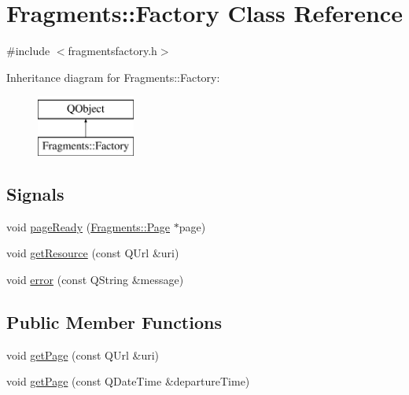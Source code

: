 \hypertarget{classFragments_1_1Factory}{}\section{Fragments\+:\+:Factory Class Reference}
\label{classFragments_1_1Factory}


{\ttfamily \#include $<$fragmentsfactory.\+h$>$}

Inheritance diagram for Fragments\+:\+:Factory\+:\begin{figure}[H]
\begin{center}
\leavevmode
\includegraphics[height=2.000000cm]{classFragments_1_1Factory}
\end{center}
\end{figure}
\subsection*{Signals}
\begin{DoxyCompactItemize}
\item 
void \mbox{\hyperlink{classFragments_1_1Factory_a9559b78a9960c0d4981bf752b47d710a}{page\+Ready}} (\mbox{\hyperlink{classFragments_1_1Page}{Fragments\+::\+Page}} $\ast$page)
\item 
void \mbox{\hyperlink{classFragments_1_1Factory_ac65f072a6cc48bb340e89a61c30688d6}{get\+Resource}} (const Q\+Url \&uri)
\item 
void \mbox{\hyperlink{classFragments_1_1Factory_ab8bdc67290ccbc5444d551fbebc68b17}{error}} (const Q\+String \&message)
\end{DoxyCompactItemize}
\subsection*{Public Member Functions}
\begin{DoxyCompactItemize}
\item 
void \mbox{\hyperlink{classFragments_1_1Factory_a37e59ac23a1a4889a5ef9348f1dfd0bc}{get\+Page}} (const Q\+Url \&uri)
\item 
void \mbox{\hyperlink{classFragments_1_1Factory_a3c9b46f2158e91190305b25616a4bc34}{get\+Page}} (const Q\+Date\+Time \&departure\+Time)
\end{DoxyCompactItemize}
